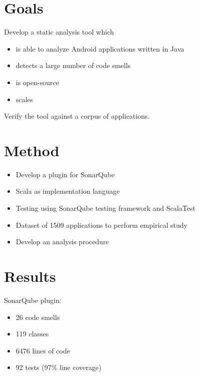 \documentclass{beamer}
\begin{document}
    \section{Goals}\label{sec:goals}
    \begin{frame}{\secname}
        Develop a static analysis tool which
        \begin{itemize}
            \item is able to analyze Android applications written in Java
            \item detects a large number of code smells
            \item is open-source
            \item scales
        \end{itemize}

        \begin{flushleft}
            Verify the tool against a corpus of applications.
        \end{flushleft}
    \end{frame}

    \section{Method}\label{sec:method}
    \begin{frame}{\secname}
        \begin{itemize}
            \item Develop a plugin for SonarQube
            \item Scala as implementation language
            \item Testing using SonarQube testing framework and ScalaTest
            \item Dataset of 1509 applications to perform empirical study
            \item Develop an analysis procedure
        \end{itemize}
    \end{frame}

    \section{Results}\label{sec:results}
    \begin{frame}{\secname}
        SonarQube plugin:
        \begin{itemize}
            \item 26 code smells
            \item 119 classes
            \item 6476 lines of code
            \item 92 tests (97\% line coverage)
        \end{itemize}
    \end{frame}
\end{document}
